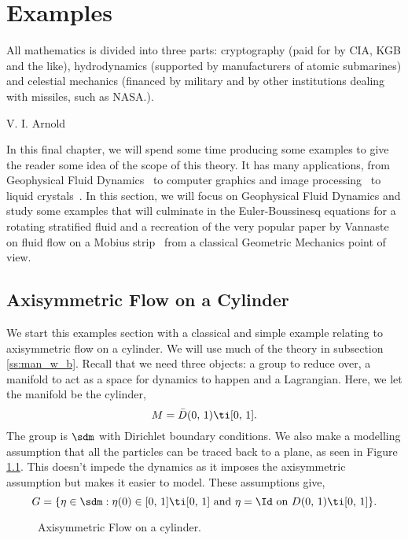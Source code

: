 
\chapter{Examples}
\epigraph{All mathematics is divided into three parts: cryptography (paid for by CIA, KGB and the like), hydrodynamics (supported by manufacturers of atomic submarines) and celestial mechanics (financed by military and by other institutions dealing with missiles, such as NASA.).}{V. I. Arnold}
\noindent
In this final chapter, we will spend some time producing some examples to give the reader some idea of the scope of this theory. It has many applications, from Geophysical Fluid Dynamics~\cite{ep_gfd} to computer graphics and image processing~\cite{holm} to liquid crystals~\cite{eppcf}. In this section, we will focus on Geophysical Fluid Dynamics and study some examples that will culminate in the Euler-Boussinesq equations for a rotating stratified fluid and a recreation of the very popular paper by Vannaste on fluid flow on a Mobius strip~\cite{vanneste_2021} from a classical Geometric Mechanics point of view.

\section{Axisymmetric Flow on a Cylinder}
We start this examples section with a classical and simple example relating to axisymmetric flow on a cylinder. We will use much of the theory in subsection \ref{ss:man_w_b}. Recall that we need three objects: a group to reduce over, a manifold to act as a space for dynamics to happen and a Lagrangian. Here, we let the manifold be the cylinder,
$$ M = \bar D(0,\,1) \ti [0,\,1]. $$
The group is $\sdm$ with Dirichlet boundary conditions. We also make a modelling assumption that all the particles can be traced back to a plane, as seen in Figure \ref{fig:cylinder}. This doesn't impede the dynamics as it imposes the axisymmetric assumption but makes it easier to model. These assumptions give,
$$ G = \{\eta \in \sdm : \eta(0) \in [0,\,1]\ti[0,\,1] \text{ and } \eta = \Id \text{ on } D(0,\,1) \ti [0,\,1]\}. $$

\begin{figure}[!ht]
\centering
\resizebox{0.4\textwidth}{!}{}
\caption{Axisymmetric Flow on a cylinder.}
\label{fig:cylinder}
\end{figure}

